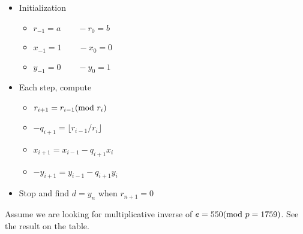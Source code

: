 \begin{itemize}
    \item Initialization
    \begin{itemize}
        \item $r_{-1}=a \hspace{2em}-r_0=b$
        \item $x_{-1}=1 \hspace{2em}-x_0=0$
        \item $y_{-1}=0 \hspace{2em}-y_0=1$
    \end{itemize}
    \item Each step, compute
    \begin{itemize}
        \item $r_{i+1}=r_{i-1} (\mathrm{mod}\ r_i)$
        \item $-q_{i+1}=\lfloor r_{i-1}/r_i\rfloor$
        \item $x_{i+1}= x_{i-1}-q_{i+1}x_i$
        \item $-y_{i+1}=y_{i-1}-q_{i+1}y_i$
    \end{itemize}
    \item Stop and find $d=y_n$ when $r_{n+1}=0$
\end{itemize}
Assume we are looking for multiplicative inverse of $e=550 (\mathrm{mod}\ p=1759)$. See the result on the table.